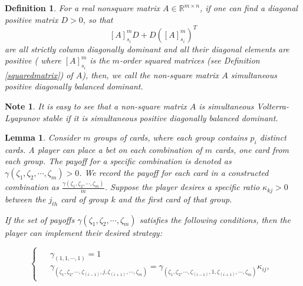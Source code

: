 \documentclass{article}
\newtheorem{lemma}{Lemma}
\newtheorem{definition}{Definition}
\newtheorem{note}{Note}
\begin{document}
\begin{definition} \label{def_CDD_lyp}
For a real nonsquare matrix $A \in \mathbb{R}^{m \times n}$, if one can find a diagonal positive matrix  $D > 0$, so that 
$$ [A]^m_{s_i} D + D ([A]^m_{s_i})^T $$
are all strictly column diagonally dominant and all their diagonal elements are positive ( where $[A]^m_{s_i}$ is the $m$-order squared matrices (see Definition \ref{squaredmatrix}) of $A$), then, we call the non-square matrix $A$ simultaneous positive diagonally balanced dominant.
\end{definition}

\begin{note}
It is easy to see that a non-square matrix $A$ is simultaneous Volterra-Lyapunov stable if it is simultaneous positive diagonally balanced dominant.
\end{note}



\begin{lemma} \label{pailiezuhe_Lemma}
Consider $m$ groups of cards, where each group contains $p_i$ distinct cards. A player can place a bet on each combination of $m$ cards, one card from each group. The payoff for a specific combination is denoted as $\gamma(\zeta_1, \zeta_2, \cdots, \zeta_m) > 0$. We record the payoff for each card in a constructed combination as $\frac{\gamma(\zeta_1, \zeta_2, \cdots, \zeta_m)}{m}$. Suppose the player desires a specific ratio $\kappa_{kj} > 0$ between the $j_{th}$ card of group $k$ and the first card of that group.

If the set of payoffs $\gamma(\zeta_1, \zeta_2, \cdots, \zeta_m)$ satisfies the following conditions, then the player can implement their desired strategy:

\begin{equation}\label{sub_sssa}
\begin{cases}
\begin{aligned}
&\gamma_{(1, 1, \cdots, 1)} = 1 \\
&\gamma_{( \zeta_1, \zeta_2, \cdots, \zeta_{(i-1)}, j, \zeta_{(i+1)}, \cdots, \zeta_{m})} = \gamma_{( \zeta_1, \zeta_2, \cdots, \zeta_{(i-1)}, 1, \zeta_{(i+1)}, \cdots, \zeta_{m})} \kappa_{ij},
\end{aligned}
\end{cases}
\end{equation}
\end{lemma}
\end{document}
